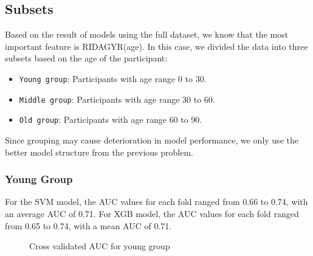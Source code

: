 \documentclass{article}
\begin{document}
\subsection{Subsets}

Based on the result of models using the full dataset, we know that the most important feature is RIDAGYR(age). In this case, we divided the data into three subsets based on the age of the participant:

\begin{itemize}
    \item \texttt{Young group}: Participants with age range 0 to 30.
    \item \texttt{Middle group}:  Participants with age range 30 to 60.
    \item \texttt{Old group}: Participants with age range 60 to 90.
\end{itemize}

Since grouping may cause deterioration in model performance, we only use the better model structure from the previous problem.

\subsubsection{Young Group}

For the SVM model, the AUC values for each fold ranged from 0.66 to 0.74, with an average AUC of 0.71. For XGB model, the AUC values for each fold ranged from 0.65 to 0.74, with a mean AUC of 0.71.

\begin{figure}[!ht]
    \centering
    \qquad
    \caption{Cross validated AUC for young group}
\end{figure}
\end{document}
